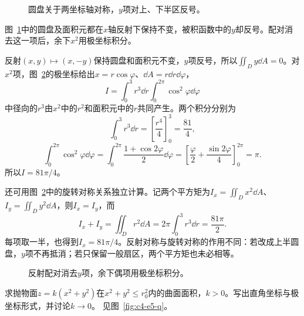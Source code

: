 \begin{figure}[H]\centering
{}
\caption{圆盘关于两坐标轴对称，$y$项对上、下半区反号。}\label{fig:c4-e4-q}
\end{figure}
\begin{solution}
图~\ref{fig:c4-e4-q}中的圆盘及面积元都在$x$轴反射下保持不变，被积函数中的$y$却反号。配对消去这一项后，余下$x^2$用极坐标积分。


反射$(x,y)\mapsto(x,-y)$保持圆盘和面积元不变，$y$项反号，所以$\iint_Dy\dd A=0$。对$x^2$项，图~\ref{fig:c4-e4-s}的极坐标给出$x=r\cos\varphi$、$\dd A=r\dd r\dd\varphi$，
\[I=\int_0^3r^3\dd r\int_0^{2\pi}\cos^2\varphi\dd\varphi
\]
中径向的$r^3$由$x^2$中的$r^2$和面积元中的$r$共同产生。两个积分分别为
\[\int_0^3r^3\dd r=\left[\frac{r^4}{4}\right]_0^3=\frac{81}4,\]
\[\int_0^{2\pi}\cos^2\varphi\dd\varphi
=\int_0^{2\pi}\frac{1+\cos2\varphi}{2}\dd\varphi
=\left[\frac\varphi2+\frac{\sin2\varphi}{4}\right]_0^{2\pi}=\pi.\]
所以$\boxed{I=81\pi/4}$。

还可用图~\ref{fig:c4-e4-s}中的旋转对称关系独立计算。记两个平方矩为$I_x=\iint_Dx^2\dd A$、$I_y=\iint_Dy^2\dd A$，则$I_x=I_y$，而
\[I_x+I_y=\iint_Dr^2\dd A
=2\pi\int_0^3r^3\dd r=\frac{81\pi}{2}.\]
每项取一半，也得到$I_x=81\pi/4$。反射对称与旋转对称的作用不同：若改成上半圆盘，$y$项不再抵消；若只保留一般扇区，两个平方矩也未必相等。

\begin{figure}[H]\centering
{}
\caption{反射配对消去$y$项，余下偶项用极坐标积分。}\label{fig:c4-e4-s}
\end{figure}
\end{solution}

\begin{example}[旋转抛物面的面积]\label{ex:c4-e5}
求抛物面$z=k(x^2+y^2)$在$x^2+y^2\le r_0^2$内的曲面面积，$k>0$。写出直角坐标与极坐标形式，并讨论$k\to0$。 见图~\ref{fig:c4-e5-q}。
\end{example}

